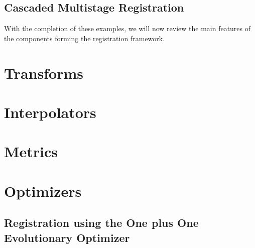 \subsection{Cascaded Multistage Registration}


With the completion of these examples, we will now review the main
features of the components forming the registration framework.


\clearpage

\section{Transforms}
\label{sec:Transforms}




\clearpage

\section{Interpolators}
\label{sec:Interpolators}


\clearpage

\section{Metrics}
\label{sec:Metrics}


\clearpage

\section{Optimizers}
\label{sec:Optimizers}




\subsection{Registration using the One plus One Evolutionary Optimizer}
\label{sec:RegistrationOnePlusOne}




